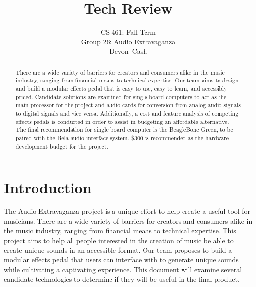 \documentclass[journal,onecolumn,draftclsnofoot]{IEEEtran}
\begin{document}
\title{Tech Review}

\author{ \large{CS 461: Fall Term} \\ Group 26: Audio Extravaganza\\Devon~Cash}

\maketitle

\begin{abstract}
 There are a wide variety of barriers for creators and consumers alike in the music industry, ranging from financial means to technical expertise. Our team aims to design and build a modular effects pedal that is easy to use, easy to learn, and accessibly priced. Candidate solutions are examined for single board computers to act as the main processor for the project and audio cards for conversion from analog audio signals to digital signals and vice versa. Additionally, a cost and feature analysis of competing effects pedals is conducted in order to assist in budgeting an affordable alternative. The final recommendation for single board computer is the BeagleBone Green, to be paired with the Bela audio interface system. \$300 is recommended as the hardware development budget for the project.
\end{abstract}

\IEEEpeerreviewmaketitle


\newpage

\section{Introduction}
The Audio Extravaganza project is a unique effort to help create a useful tool for musicians. There are a wide variety of barriers for creators and consumers alike in the music industry, ranging from financial means to technical expertise. This project aims to help all people interested in the creation of music be able to create unique sounds in an accessible format. Our team proposes to build a modular effects pedal that users can interface with to generate unique sounds while cultivating a captivating experience. This document will examine several candidate technologies to determine if they will be useful in the final product.
\end{document}
